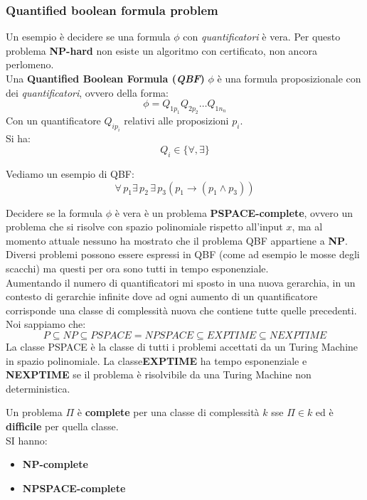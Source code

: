 \documentclass[a4paper,12pt, oneside]{book}
\begin{document}
\subsubsection{Quantified boolean formula problem}
Un esempio è decidere se una formula $\phi$ con \textit{quantificatori} è
vera. Per questo problema \textbf{NP-hard} non esiste un algoritmo con
certificato, non ancora perlomeno.\\
Una \textbf{Quantified Boolean Formula (\textit{QBF})} $\phi$ è una formula
proposizionale con dei \textit{quantificatori}, ovvero della forma:
\[\phi=Q_{1p_1}Q_{2p_2}\ldots Q_{1n_n}\]
Con un quantificatore $Q_{ip_i}$ relativi alle proposizioni $p_i$.\\
Si ha:
\[Q_i\in\{\forall,\exists\}\]
\begin{esempio}
  Vediamo un esempio di QBF:
  \[\forall\, p_1\exists\,p_2\,\exists\, p_3(p_1\to(p_1\land p_3))\]
\end{esempio}
Decidere se la formula $\phi$ è vera è un problema \textbf{PSPACE-complete},
ovvero un problema che si risolve con spazio polinomiale rispetto all'input $x$,
ma al momento attuale nessuno ha mostrato che il problema QBF appartiene a
\textbf{NP}.\\
Diversi problemi possono essere espressi in QBF (come ad esempio le mosse degli
scacchi) ma questi per ora sono tutti in tempo esponenziale.\\
Aumentando il numero di quantificatori mi sposto in una nuova gerarchia, in un
contesto di gerarchie infinite dove ad ogni aumento di un quantificatore
corrisponde una classe di complessità nuova che contiene tutte quelle
precedenti.\\
Noi sappiamo che:
\[P\subseteq NP\subseteq PSPACE=NPSPACE\subseteq EXPTIME\subseteq NEXPTIME\]
La classe PSPACE è la classe di tutti i problemi accettati da un Turing Machine
in spazio polinomiale. La classe\textbf{EXPTIME} ha tempo esponenziale e
\textbf{NEXPTIME} se il problema è risolvibile da una Turing Machine non
deterministica.
\begin{definizione}
  Un problema $\Pi$ è \textbf{complete} per una classe di complessità $k$ sse 
  $\Pi\in k$ ed è \textbf{difficile} per quella classe.\\
  SI hanno:
  \begin{itemize}
    \item \textbf{NP-complete}
    \item \textbf{NPSPACE-complete}
  \end{itemize}
\end{definizione}
\end{document}
